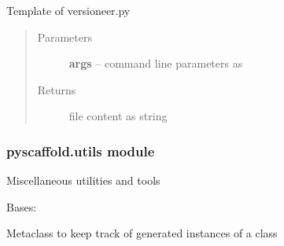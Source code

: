 \documentclass[letterpaper,10pt,english]{sphinxmanual}
\begin{document}

\begin{fulllineitems}
\label{_rst/pyscaffold:pyscaffold.templates.versioneer}
Template of versioneer.py
\begin{quote}\begin{description}
\item[{Parameters}] \leavevmode
\textbf{args} -- command line parameters as \href{http://docs.python.org/2.7/library/argparse.html\#argparse.Namespace}{}

\item[{Returns}] \leavevmode
file content as string

\end{description}\end{quote}

\end{fulllineitems}



\subsubsection{pyscaffold.utils module}
\label{_rst/pyscaffold:pyscaffold-utils-module}\label{_rst/pyscaffold:module-pyscaffold.utils}
Miscellaneous utilities and tools

\begin{fulllineitems}
\label{_rst/pyscaffold:pyscaffold.utils.ObjKeeper}
Bases: 

Metaclass to keep track of generated instances of a class

\begin{fulllineitems}
\label{_rst/pyscaffold:pyscaffold.utils.ObjKeeper.instances}
\end{fulllineitems}


\end{fulllineitems}

\end{document}
